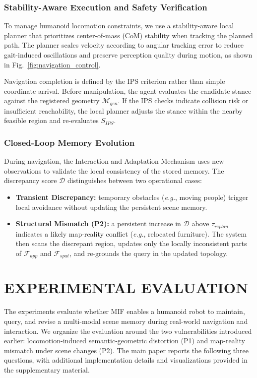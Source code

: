 \documentclass[conference]{IEEEtran}
\begin{document}
\subsubsection{Stability-Aware Execution and Safety Verification}
%
To manage humanoid locomotion constraints, we use a stability-aware local planner that prioritizes center-of-mass (CoM) stability when tracking the planned path.
%
The planner scales velocity according to angular tracking error to reduce gait-induced oscillations and preserve perception quality during motion, as shown in Fig.~\ref{fig:navigation_control}.
%

Navigation completion is defined by the IPS criterion rather than simple coordinate arrival.
%
Before manipulation, the agent evaluates the candidate stance against the registered geometry $\mathcal{M}_{gen}$.
%
If the IPS checks indicate collision risk or insufficient reachability, the local planner adjusts the stance within the nearby feasible region and re-evaluates $S_{IPS}$.



\subsubsection{Closed-Loop Memory Evolution}
%
During navigation, the Interaction and Adaptation Mechanism uses new observations to validate the local consistency of the stored memory.
%
The discrepancy score $\mathcal{D}$ distinguishes between two operational cases:


\begin{itemize}
    \item \textbf{Transient Discrepancy:} temporary obstacles (\emph{e.g.}, moving people) trigger local avoidance without updating the persistent scene memory.
    \item \textbf{Structural Mismatch (P2):} a persistent increase in $\mathcal{D}$ above $\tau_{replan}$ indicates a likely map-reality conflict (\emph{e.g.}, relocated furniture). The system then scans the discrepant region, updates only the locally inconsistent parts of $\mathcal{F}_{app}$ and $\mathcal{F}_{spat}$, and re-grounds the query in the updated topology.
\end{itemize}


\section{EXPERIMENTAL EVALUATION}
\label{sec:experiments}
%
The experiments evaluate whether MIF enables a humanoid robot to maintain, query, and revise a multi-modal scene memory during real-world navigation and interaction.
%
We organize the evaluation around the two vulnerabilities introduced earlier: locomotion-induced semantic-geometric distortion (P1) and map-reality mismatch under scene changes (P2).
%
The main paper reports the following three questions, with additional implementation details and visualizations provided in the supplementary material.
%
\end{document}
